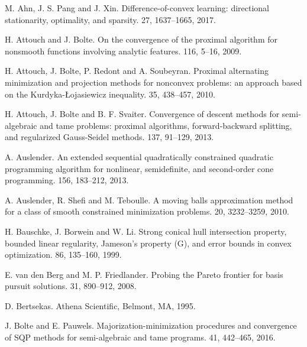 \documentclass[10pt]{article}
\numberwithin{equation}{section}
\begin{document}
\begin{thebibliography}{99}

M. Ahn, J. S. Pang and J. Xin.
\newblock Difference-of-convex learning: directional stationarity, optimality, and sparsity.
 27, 1637--1665, 2017.


H. Attouch and J. Bolte.
\newblock On the convergence of the proximal algorithm for nonsmooth functions involving analytic features.
 116, 5--16, 2009.

H. Attouch, J. Bolte, P. Redont and A. Soubeyran.
\newblock Proximal alternating minimization and projection methods for nonconvex problems: an approach based on the Kurdyka-{\L}ojasiewicz inequality.
 35, 438--457, 2010.

H. Attouch, J. Bolte and B. F. Svaiter.
\newblock Convergence of descent methods for semi-algebraic and tame problems: proximal algorithms, forward-backward splitting, and regularized Gauss-Seidel methods.
 137, 91--129, 2013.

A. Auslender.
\newblock An extended sequential quadratically constrained quadratic programming algorithm for nonlinear, semidefinite, and second-order cone programming.
 156, 183--212, 2013.

A. Auslender, R. Shefi and M. Teboulle.
\newblock A moving balls approximation method for a class of smooth constrained minimization problems.
 20, 3232--3259, 2010.

H. Bauschke, J. Borwein and W. Li.
\newblock Strong conical hull intersection property, bounded linear regularity, Jameson's property (G), and error bounds in convex optimization.
 86, 135--160, 1999.

E. van den Berg and M. P. Friedlander.
\newblock Probing the Pareto frontier for basis pursuit solutions.
 31, 890--912, 2008.

D. Bertsekas.
\newblock Athena Scientific, Belmont, MA, 1995.

J. Bolte and E. Pauwels.
\newblock Majorization-minimization procedures and convergence of SQP methods for semi-algebraic and tame programs.
 41, 442--465, 2016.


\end{thebibliography}
\end{document}
